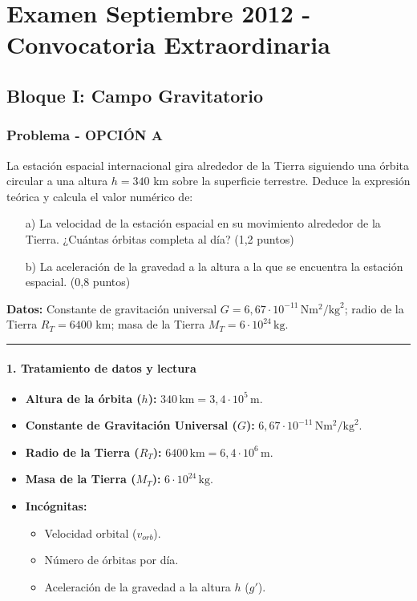 \chapter{Examen Septiembre 2012 - Convocatoria Extraordinaria}
\label{chap:2012_sep}

\section{Bloque I: Campo Gravitatorio}
\label{sec:grav_2012_sep}

\subsection{Problema - OPCIÓN A}
\label{subsec:IA_2012_sep}

\begin{cajaenunciado}
La estación espacial internacional gira alrededor de la Tierra siguiendo una órbita circular a una altura $h=340$ km sobre la superficie terrestre. Deduce la expresión teórica y calcula el valor numérico de:
\begin{enumerate}
    \item[a)] La velocidad de la estación espacial en su movimiento alrededor de la Tierra. ¿Cuántas órbitas completa al día? (1,2 puntos)
    \item[b)] La aceleración de la gravedad a la altura a la que se encuentra la estación espacial. (0,8 puntos)
\end{enumerate}
\textbf{Datos:} Constante de gravitación universal $G=6,67\cdot10^{-11}\,\text{N}\text{m}^2/\text{kg}^2$; radio de la Tierra $R_T=6400$ km; masa de la Tierra $M_T=6\cdot10^{24}\,\text{kg}$.
\end{cajaenunciado}
\hrule

\subsubsection*{1. Tratamiento de datos y lectura}
\begin{itemize}
    \item \textbf{Altura de la órbita ($h$):} $340\,\text{km} = 3,4 \cdot 10^5\,\text{m}$.
    \item \textbf{Constante de Gravitación Universal ($G$):} $6,67 \cdot 10^{-11}\,\text{N}\text{m}^2/\text{kg}^2$.
    \item \textbf{Radio de la Tierra ($R_T$):} $6400\,\text{km} = 6,4 \cdot 10^6\,\text{m}$.
    \item \textbf{Masa de la Tierra ($M_T$):} $6 \cdot 10^{24}\,\text{kg}$.
    \item \textbf{Incógnitas:}
    \begin{itemize}
        \item Velocidad orbital ($v_{orb}$).
        \item Número de órbitas por día.
        \item Aceleración de la gravedad a la altura $h$ ($g'$).
    \end{itemize}
\end{itemize}

